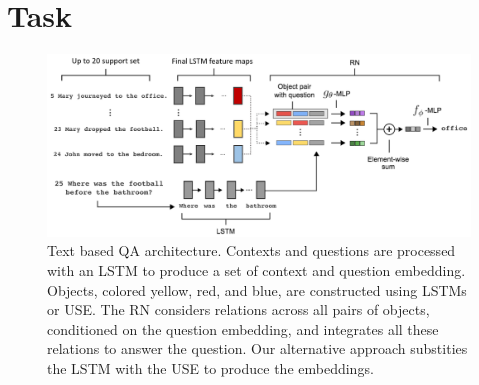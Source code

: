 \documentclass{article}
\begin{document}


%
%










\section{Task}
%


\begin{figure}
  \centering
  \includegraphics[scale=0.3]{relation_network_babi.png}
  \caption{Text based QA architecture. Contexts and questions are processed with an LSTM to produce a set of context and question embedding. Objects, colored yellow, red, and blue, are constructed using LSTMs or USE. The RN considers relations across all pairs of objects, conditioned on the question embedding, and integrates all these relations to answer the question. Our alternative approach substities the LSTM with the USE to produce the embeddings.}
\end{figure}
\end{document}
